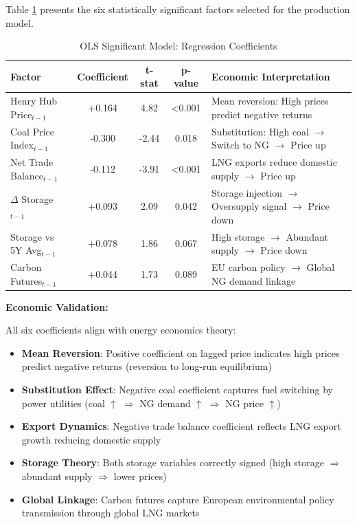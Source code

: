 \documentclass[12pt,a4paper]{article}
\begin{document}
Table \ref{tab:coefficients} presents the six statistically significant factors selected for the production model.

\begin{table}[H]
\centering
\caption{OLS Significant Model: Regression Coefficients}
\label{tab:coefficients}
\begin{tabular}{@{}lcccp{6cm}@{}}
\toprule
\textbf{Factor} & \textbf{Coefficient} & \textbf{t-stat} & \textbf{p-value} & \textbf{Economic Interpretation} \\
\midrule
Henry Hub Price$_{t-1}$ & +0.164 & 4.82 & <0.001 & Mean reversion: High prices predict negative returns \\
Coal Price Index$_{t-1}$ & -0.300 & -2.44 & 0.018 & Substitution: High coal $\rightarrow$ Switch to NG $\rightarrow$ Price up \\
Net Trade Balance$_{t-1}$ & -0.112 & -3.91 & <0.001 & LNG exports reduce domestic supply $\rightarrow$ Price up \\
$\Delta$ Storage$_{t-1}$ & +0.093 & 2.09 & 0.042 & Storage injection $\rightarrow$ Oversupply signal $\rightarrow$ Price down \\
Storage vs 5Y Avg$_{t-1}$ & +0.078 & 1.86 & 0.067 & High storage $\rightarrow$ Abundant supply $\rightarrow$ Price down \\
Carbon Futures$_{t-1}$ & +0.044 & 1.73 & 0.089 & EU carbon policy $\rightarrow$ Global NG demand linkage \\
\bottomrule
\end{tabular}
\end{table}

\textbf{Economic Validation:}

All six coefficients align with energy economics theory:

\begin{itemize}
    \item \textbf{Mean Reversion}: Positive coefficient on lagged price indicates high prices predict negative returns (reversion to long-run equilibrium)

    \item \textbf{Substitution Effect}: Negative coal coefficient captures fuel switching by power utilities (coal $\uparrow$ $\Rightarrow$ NG demand $\uparrow$ $\Rightarrow$ NG price $\uparrow$)

    \item \textbf{Export Dynamics}: Negative trade balance coefficient reflects LNG export growth reducing domestic supply

    \item \textbf{Storage Theory}: Both storage variables correctly signed (high storage $\Rightarrow$ abundant supply $\Rightarrow$ lower prices)

    \item \textbf{Global Linkage}: Carbon futures capture European environmental policy transmission through global LNG markets
\end{itemize}
\end{document}

